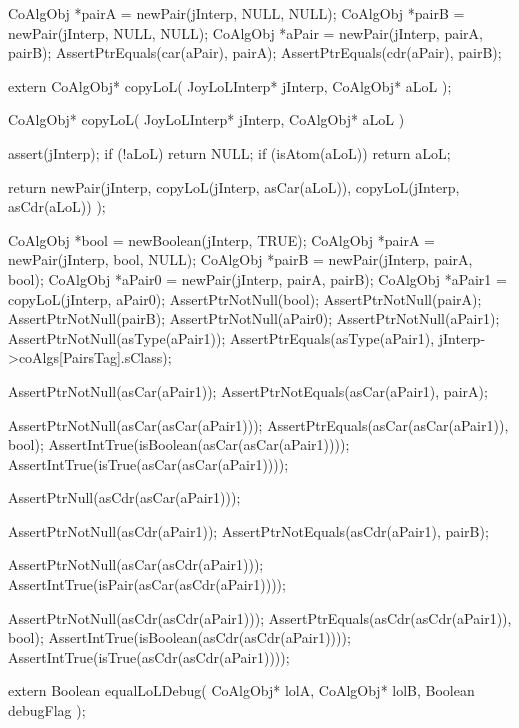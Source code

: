 \startCTest
  CoAlgObj *pairA = newPair(jInterp, NULL, NULL);
  CoAlgObj *pairB = newPair(jInterp, NULL, NULL);
  CoAlgObj *aPair = newPair(jInterp, pairA, pairB);
  AssertPtrEquals(car(aPair), pairA);
  AssertPtrEquals(cdr(aPair), pairB);
\stopCTest
\stopTestCase
\stopTestSuite

\startTestSuite[copyLoL]

\startCHeader
extern CoAlgObj* copyLoL(
  JoyLoLInterp* jInterp,
  CoAlgObj* aLoL
);
\stopCHeader

\startCCode
CoAlgObj* copyLoL(
  JoyLoLInterp* jInterp,
  CoAlgObj* aLoL
) {
  assert(jInterp);
  if (!aLoL) return NULL;
  if (isAtom(aLoL)) return aLoL;

  return newPair(jInterp,
                 copyLoL(jInterp, asCar(aLoL)),
                 copyLoL(jInterp, asCdr(aLoL))
                 );
}
\stopCCode


\startCTest
  CoAlgObj *bool   = newBoolean(jInterp, TRUE);
  CoAlgObj *pairA  = newPair(jInterp, bool, NULL);
  CoAlgObj *pairB  = newPair(jInterp, pairA, bool);
  CoAlgObj *aPair0 = newPair(jInterp, pairA, pairB);
  CoAlgObj *aPair1 = copyLoL(jInterp, aPair0);
  AssertPtrNotNull(bool);
  AssertPtrNotNull(pairA);
  AssertPtrNotNull(pairB);
  AssertPtrNotNull(aPair0);
  AssertPtrNotNull(aPair1);
  AssertPtrNotNull(asType(aPair1));
  AssertPtrEquals(asType(aPair1), jInterp->coAlgs[PairsTag].sClass);

  AssertPtrNotNull(asCar(aPair1));
  AssertPtrNotEquals(asCar(aPair1), pairA);

  AssertPtrNotNull(asCar(asCar(aPair1)));
  AssertPtrEquals(asCar(asCar(aPair1)), bool);
  AssertIntTrue(isBoolean(asCar(asCar(aPair1))));
  AssertIntTrue(isTrue(asCar(asCar(aPair1))));

  AssertPtrNull(asCdr(asCar(aPair1)));

  AssertPtrNotNull(asCdr(aPair1));
  AssertPtrNotEquals(asCdr(aPair1), pairB);

  AssertPtrNotNull(asCar(asCdr(aPair1)));
  AssertIntTrue(isPair(asCar(asCdr(aPair1))));

  AssertPtrNotNull(asCdr(asCdr(aPair1)));
  AssertPtrEquals(asCdr(asCdr(aPair1)), bool);
  AssertIntTrue(isBoolean(asCdr(asCdr(aPair1))));
  AssertIntTrue(isTrue(asCdr(asCdr(aPair1))));
\stopCTest
\stopTestCase
\stopTestSuite

\startTestSuite[equalLoL]

\startCHeader
extern Boolean equalLoLDebug(
  CoAlgObj* lolA,
  CoAlgObj* lolB,
  Boolean debugFlag
);

